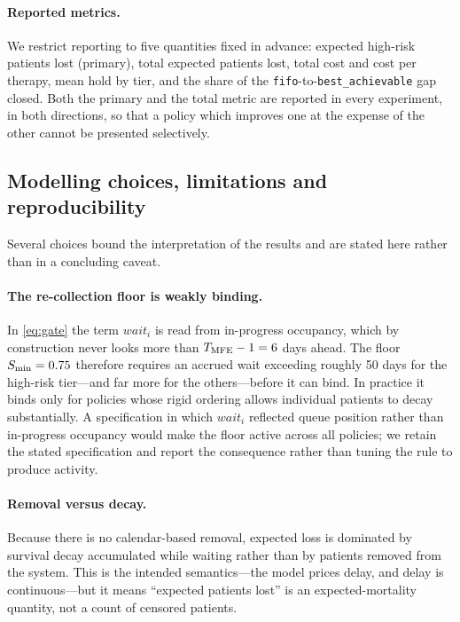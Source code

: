 \paragraph{Reported metrics.} We restrict reporting to five quantities fixed in
advance: expected high-risk patients lost (primary), total expected patients
lost, total cost and cost per therapy, mean hold by tier, and the share of the
\texttt{fifo}-to-\texttt{best\_achievable} gap closed. Both the primary and the
total metric are reported in every experiment, in both directions, so that a
policy which improves one at the expense of the other cannot be presented
selectively.

\subsection{Modelling choices, limitations and reproducibility}
\label{sec:limits}

Several choices bound the interpretation of the results and are stated here
rather than in a concluding caveat.

\paragraph{The re-collection floor is weakly binding.} In \eqref{eq:gate} the
term $\mathit{wait}_i$ is read from in-progress occupancy, which by
construction never looks more than $T_{\mathrm{MFE}} - 1 = 6$ days ahead. The floor $S_{\min}
= 0.75$ therefore requires an accrued wait exceeding roughly 50 days for the
high-risk tier---and far more for the others---before it can bind. In practice
it binds only for policies whose rigid ordering allows individual patients to
decay substantially. A specification in which $\mathit{wait}_i$ reflected queue
position rather than in-progress occupancy would make the floor active across
all policies; we retain the stated specification and report the consequence
rather than tuning the rule to produce activity.

\paragraph{Removal versus decay.} Because there is no calendar-based removal,
expected loss is dominated by survival decay accumulated while waiting rather
than by patients removed from the system. This is the intended semantics---the
model prices delay, and delay is continuous---but it means ``expected patients
lost'' is an expected-mortality quantity, not a count of censored patients.


